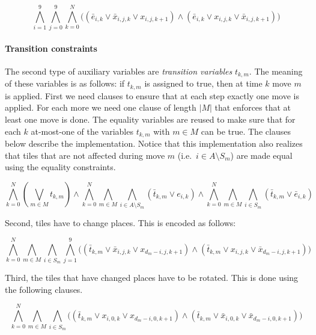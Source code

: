 \documentclass[]{llncs}
\begin{document}
\begin{equation}
\bigwedge_{i=1}^9 \bigwedge_{j=0}^9 \bigwedge_{k=0}^{N} \big( (\bar e_{i,k} \lor \bar x_{i,j,k} \lor x_{i,j,k+1}) \land (\bar e_{i,k} \lor x_{i,j,k} \lor \bar x_{i,j,k+1}) \big )
\end{equation}

\paragraph{Transition constraints} The second type of auxiliary variables are {\em transition variables} $t_{k,m}$.
The meaning of these variables is as follows: if $t_{k,m}$ is assigned to true, then at time $k$ move $m$ is applied.
First we need clauses to ensure that at each step exactly one move is applied. For each more we need one clause of
length $|M|$ that enforces that at least one move is done. The equality variables are reused to make sure that for each $k$
at-most-one of the variables $t_{k,m}$ with $m \in M$ can be true. The clauses below describe the implementation.
Notice that this implementation also realizes that tiles that are not affected during move $m$ (i.e.\ $i \in A \setminus S_m$)
are made equal using the equality constraints.

\begin{equation}
\bigwedge_{k=0}^{N} (\bigvee_{m \in M} t_{k,m}) \land \bigwedge_{k=0}^{N} \bigwedge_{m \in M} \bigwedge_{i \in A \setminus S_m} (\bar t_{k,m} \lor e_{i,k}) \land
 \bigwedge_{k=0}^{N} \bigwedge_{m \in M} \bigwedge_{i \in S_m} (\bar t_{k,m} \lor \bar e_{i,k})
\end{equation}

Second, tiles have to change places. This is encoded as follows:

\begin{equation}
\bigwedge_{k=0}^{N} \bigwedge_{m \in M} \bigwedge_{i \in S_m} \bigwedge_{j=1}^9 \big( (\bar t_{k,m} \lor \bar x_{i,j,k} \lor x_{d_m - i,j,k + 1} ) \land (\bar t_{k,m} \lor x_{i,j,k} \lor \bar x_{d_m - i,j,k + 1} ) \big)
\end{equation}

Third, the tiles that have changed places have to be rotated. This is done using the following clauses.

\begin{equation}
\bigwedge_{k=0}^{N} \bigwedge_{m \in M} \bigwedge_{i \in S_m} \big( (\bar t_{k,m} \lor x_{i,0,k} \lor x_{d_m - i,0,k + 1} ) \land (\bar t_{k,m} \lor \bar x_{i,0,k} \lor \bar x_{d_m - i,0,k + 1} ) \big)
\end{equation}
\end{document}
